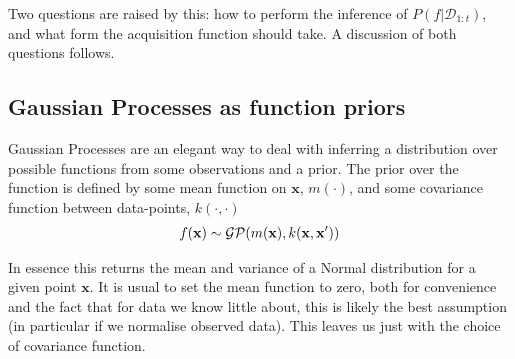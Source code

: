 Two questions are raised by this: how to perform the inference of \( P(f|\mathcal{D}_{1:t}) \), and what form the acquisition function should take. A discussion of both questions follows.

\subsection{Gaussian Processes as function priors}
Gaussian Processes are an elegant way to deal with inferring a distribution over possible functions from some observations and a prior. The prior over the function is defined by some mean function on \( \mathbf{x} \), \( m(\cdot) \), and some covariance function between data-points, \( k(\cdot, \cdot) \)
\begin{align}
	f(\mathbf{x}) \sim \operatorname{\mathcal{GP}}(m(\mathbf{x}), k(\mathbf{x}, \mathbf{x}'))
\end{align}

In essence this returns the mean and variance of a Normal distribution for a given point \( \mathbf{x} \). It is usual to set the mean function to zero, both for convenience and the fact that for data we know little about, this is likely the best assumption (in particular if we normalise observed data). This leaves us just with the choice of covariance function. 


